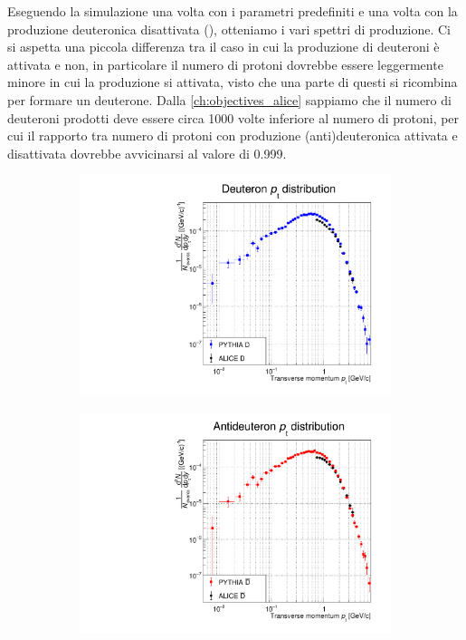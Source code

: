 Eseguendo la simulazione una volta con i parametri predefiniti e una volta con la produzione deuteronica disattivata (), otteniamo i vari spettri di produzione.
Ci si aspetta una piccola differenza tra il caso in cui la produzione di deuteroni è attivata e non, in particolare il numero di protoni dovrebbe essere leggermente minore in cui la produzione si attivata, visto che una parte di questi si ricombina per formare un deuterone.
Dalla \autoref{ch:objectives_alice} sappiamo che il numero di deuteroni prodotti deve essere circa 1000 volte inferiore al numero di protoni, per cui il rapporto tra numero di protoni con produzione (anti)deuteronica attivata e disattivata dovrebbe avvicinarsi al valore di 0.999.
\begin{figure}[htb]
    \centering
    \begin{subfigure}{.49\textwidth}
    \centering
        \includegraphics[width=\textwidth]{image/3-risultati/analyse/A/deuteron.pdf}
        \caption{}
        \label{fig:A_deuteron}
    \end{subfigure}
    \begin{subfigure}{.49\textwidth}
        \centering
        \includegraphics[width=\textwidth]{image/3-risultati/analyse/A/antideuteron.pdf}

\end{subfigure}
\end{figure}
